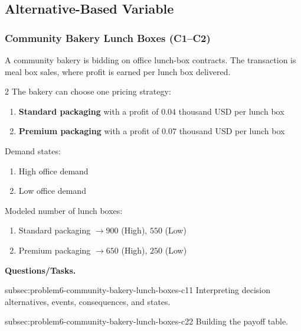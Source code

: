 \subsection{Alternative-Based Variable}
	\label{sec:alternative-based-variable-payoff-profit-per-item-times-number-of-items}


	\subsubsection{Community Bakery Lunch Boxes (C1--C2)}
	\label{sec:problem6-community-bakery-lunch-boxes-c1-c2}
	A community bakery is bidding on office lunch-box contracts. The transaction is meal box sales, where profit is earned per lunch box delivered.

	\begin{multicols}{2}
		The bakery can choose one pricing strategy:
		\begin{enumerate}[label=\arabic*.]
			\item \textbf{Standard packaging} with a profit of $0.04$ thousand USD per lunch box
			\item \textbf{Premium packaging} with a profit of $0.07$ thousand USD per lunch box
		\end{enumerate}

		Demand states:
		\begin{enumerate}[label=\arabic*.]
			\item High office demand
			\item Low office demand
		\end{enumerate}

			\columnbreak

		Modeled number of lunch boxes:
		\begin{enumerate}[label=\arabic*.]
			\item Standard packaging $\to 900$ (High), $550$ (Low)
			\item Premium packaging $\to 650$ (High), $250$ (Low)
		\end{enumerate}
	\end{multicols}

	\textbf{Questions/Tasks.}
	\begin{enumerate}
		\CriterionTask
		{subsec:problem6-community-bakery-lunch-boxes-c1}{1}
		{Interpreting decision alternatives, events, consequences, and states.}

		\CriterionTask
		{subsec:problem6-community-bakery-lunch-boxes-c2}{2}
		{Building the payoff table.}
	\end{enumerate}

